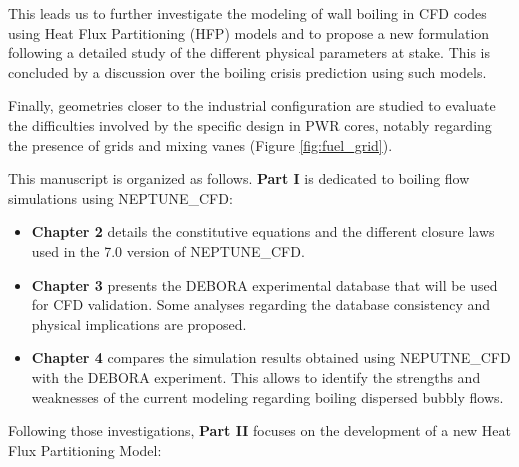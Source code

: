 This leads us to further investigate the modeling of wall boiling in CFD codes using Heat Flux Partitioning (HFP) models and to propose a new formulation following a detailed study of the different physical parameters at stake. This is concluded by a discussion over the boiling crisis prediction using such models. 

\npar

Finally, geometries closer to the industrial configuration are studied to evaluate the difficulties involved by the specific design in PWR cores, notably regarding the presence of grids and mixing vanes (Figure \ref{fig:fuel_grid}).

\npar

This manuscript is organized as follows. \textbf{Part I} is dedicated to boiling flow simulations using NEPTUNE\_CFD:

\begin{itemize}
\item \textbf{Chapter 2} details the constitutive equations and the different closure laws used in the 7.0 version of NEPTUNE\_CFD. 

\item \textbf{Chapter 3} presents the DEBORA experimental database that will be used for CFD validation. Some analyses regarding the database consistency and physical implications are proposed.

\item \textbf{Chapter 4} compares the simulation results obtained using NEPUTNE\_CFD with the DEBORA experiment. This allows to identify the strengths and weaknesses of the current modeling regarding boiling dispersed bubbly flows.

\end{itemize}


Following those investigations, \textbf{Part II} focuses on the development of a new Heat Flux Partitioning Model:

